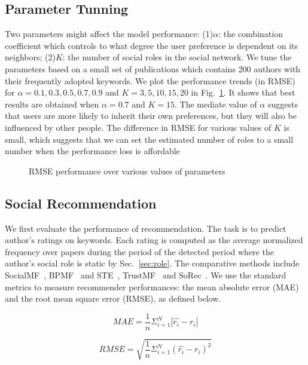 \documentclass{ieeeaccess}
\begin{document}
\subsection{Parameter Tunning}
Two parameters might affect the model performance: (1)$\alpha$: the combination coefficient which controls to what degree the user preference is dependent on its neighbors; (2)$K$: the number of social roles in the social network. We tune the parameters based on a small set of publications which contains 200 authors with their frequently adopted keywords. We plot the performance trends (in RMSE) for $\alpha= 0.1,0.3,0.5,0.7,0.9$ and $K=3,5,10,15,20$ in Fig.~\ref{fig:parameter}. It shows that best results are obtained when $\alpha=0.7$ and $K=15$. The mediate value of $\alpha$ suggests that users are more likely to inherit their own preferences, but they will also be influenced by other people. The difference in RMSE for various values of $K$ is small, which suggests that we can set the estimated number of roles to a small number when the performance loss is affordable
\begin{figure}[htbp]
\centering
{}
\caption{RMSE performance over various values of parameters}
\label{fig:parameter}
\end{figure}

\subsection{Social Recommendation}
We first evaluate the performance of recommendation. The task is to predict author's ratings on keywords. Each rating is computed as the average normalized frequency over papers during the period of the detected period where the author's social role is static by Sec.~\ref{sec:role}. The comparative methods include SocialMF~\cite{Jamali2010matrix}, BPMF~\cite{Salakhutdinov2008Bayesian} and STE~\cite{ma2009learning}, TrustMF~\cite{Yang2013Social} and SoRec~\cite{ma2008sorec}. We use the standard metrics to measure recommender performances: the mean absolute error (MAE) and the root mean square error (RMSE), as defined below.

\begin{equation*}
MAE=\frac{1}{n}\Sigma_{i=1}^{N}|\hat{r_i}-r_i|
\end{equation*}

\begin{equation*}
RMSE=\sqrt{\frac{1}{n}\Sigma_{i=1}^{N}{(\hat{r_i}-r_i)}^2}
\end{equation*}
\end{document}
